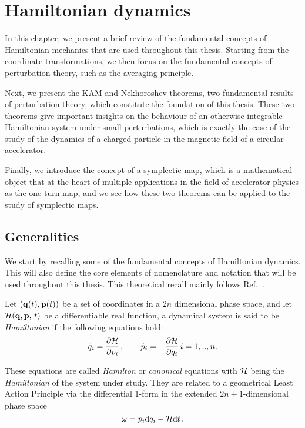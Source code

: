 
\chapter{Hamiltonian dynamics}\label{ch:mathematical_elements}

In this chapter, we present a brief review of the fundamental concepts of Hamiltonian mechanics that are used throughout this thesis. Starting from the coordinate transformations, we then focus on the fundamental concepts of perturbation theory, such as the averaging principle.

Next, we present the KAM and Nekhoroshev theorems, two fundamental results of perturbation theory, which constitute the foundation of this thesis. These two theorems give important insights on the behaviour of an otherwise integrable Hamiltonian system under small perturbations, which is exactly the case of the study of the dynamics of a charged particle in the magnetic field of a circular accelerator.

Finally, we introduce the concept of a symplectic map, which is a mathematical object that at the heart of multiple applications in the field of accelerator physics as the one-turn map, and we see how these two theorems can be applied to the study of symplectic maps.

\section{Generalities}\label{sec:1:hamiltonian}

We start by recalling some of the fundamental concepts of Hamiltonian dynamics. This will also define the core elements of nomenclature and notation that will be used throughout this thesis. This theoretical recall mainly follows Ref.~\cite{Arnold:937549}.

Let $(\vb{q}(t),\vb{p}(t))$ be a set of coordinates in a 2$n$ dimensional phase space, and let $\mathcal{H}(\vb{q},\vb{p},\, t)$ be a differentiable real function, a dynamical system is said to be \textit{Hamiltonian} if the following equations hold:
%
\begin{equation} 
	\dot q_i = \pdv{\mathcal{H}}{p_i}
		\,,\qquad 		\dot p_i = -\pdv{\mathcal{H}}{q_i} \, i=1,..,n.
	\label{hameq}
 \end{equation} 

These equations are called \textit{Hamilton} or \textit{canonical} equations with $\mathcal{H}$ being the \textit{Hamiltonian} of the system under study. They are related to a geometrical Least Action Principle via the differential 1-form in the extended $2n+1$-dimensional phase space 
%
\begin{equation} \omega = p_i \dd q_i -\mathcal{H} \dd t \, .  
\end{equation}

